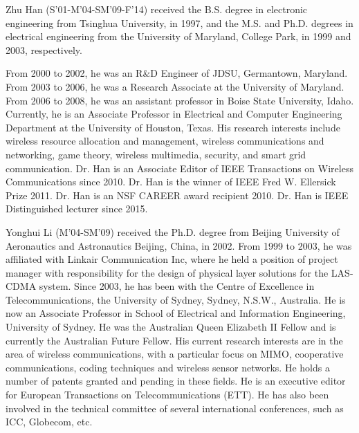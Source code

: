 \documentclass[onecolumn,12pt]{IEEEtran}
\begin{document}
\begin{biography}{Zhu Han}
(S'01-M'04-SM'09-F'14) received the B.S. degree in electronic engineering from Tsinghua University, in 1997, and the M.S. and Ph.D. degrees in electrical engineering from the University of Maryland, College Park, in 1999 and 2003, respectively.

From 2000 to 2002, he was an R$\&$D Engineer of JDSU, Germantown, Maryland. From 2003 to 2006, he was a Research Associate at the University of Maryland. From 2006 to 2008, he was an assistant professor in Boise State University, Idaho. Currently, he is an Associate Professor in Electrical and Computer Engineering Department at the University of Houston, Texas. His research interests include wireless resource allocation and management, wireless communications and networking, game theory, wireless multimedia, security, and smart grid communication. Dr. Han is an Associate Editor of IEEE Transactions on Wireless Communications since 2010. Dr. Han is the winner of IEEE Fred W. Ellersick Prize 2011. Dr. Han is an NSF CAREER award recipient 2010. Dr. Han is IEEE Distinguished lecturer since 2015.
\end{biography}

\begin{biography}{Yonghui Li}
(M'04-SM'09) received the Ph.D. degree from Beijing University of Aeronautics and Astronautics Beijing, China, in 2002. From 1999 to 2003, he was affiliated with Linkair Communication Inc, where he held a position of project manager with responsibility for the design of physical layer solutions for the LAS-CDMA system. Since 2003, he has been with the Centre of Excellence in Telecommunications, the University of Sydney, Sydney, N.S.W., Australia. He is now an Associate Professor in School of Electrical and Information Engineering, University of Sydney. He was the Australian Queen Elizabeth II Fellow and is currently the Australian Future Fellow. His current research interests are in the area of wireless communications, with a particular focus on MIMO, cooperative communications, coding techniques and wireless sensor networks. He holds a number of patents granted and pending in these fields. He is an executive editor for European Transactions on Telecommunications (ETT). He has also been involved in the technical committee of several international conferences, such as ICC, Globecom, etc.
\end{biography}
\end{document}
